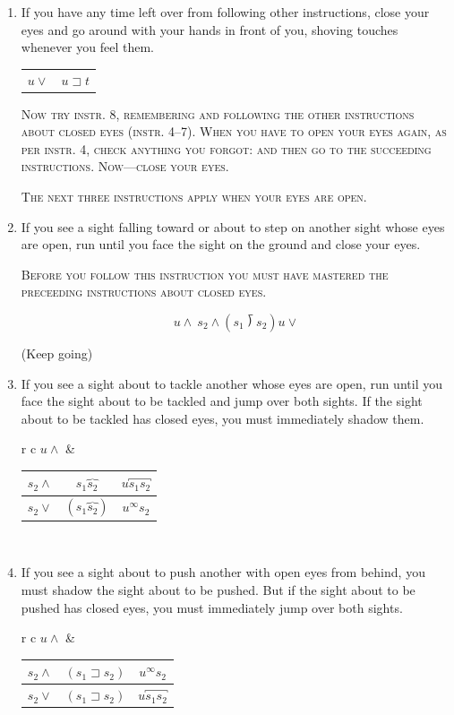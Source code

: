 \begin{enumerate}[label=\arabic*.,nosep, wide]
\item If you have any time left over from following other instructions, 
close your eyes and go around with your hands in front of you, shoving 
touches whenever you feel them. 

\begin{tabular}{ c c }
	$u\vee$ & $u\sqsupset t$ \\
\end{tabular}

\textsc{Now try instr. 8, remembering and following the other instructions about closed eyes (instr. 4--7).
When you have to open your eyes again, as per instr. 4, check anything you forgot: and then go to the
succeeding instructions. Now---close your eyes.}

\textsc{The next three instructions apply when your eyes are open.}

\item If you see a sight falling toward or about to step on another sight 
whose eyes are open, run until you face the sight on the ground and close 
your eyes. 

\textsc{Before you follow this instruction you must have mastered the preceeding instructions about closed eyes.}

$$
u\wedge\ s_2\wedge(s_1\longdivision{s_2}) u\vee
$$

(Keep going) 

\clearpage


\item If you see a sight about to tackle another whose eyes are open, run 
until you face the sight about to be tackled and jump over both sights. If the 
sight about to be tackled has closed eyes, you must immediately shadow 
them. 

\begin{tabular}{ r c }
	$u\wedge$ & \begin{tabular}{ c c c }
		$s_2\wedge$ & $s_1\overbrace{s_2}$ & $u\overbracket{s_1s_2}$ \\ \midrule
		$s_2\vee$ & $(s_1\overbrace{s_2})$ & $u^\infty s_2$
	\end{tabular} \\
\end{tabular}

\item If you see a sight about to push another with open eyes from 
behind, you must shadow the sight about to be pushed. But if the sight 
about to be pushed has closed eyes, you must immediately jump over both 
sights. 

\begin{tabular}{ r c }
	$u\wedge$ & \begin{tabular}{ c c c }
		$s_2\wedge$ & $(s_1\sqsupset s_2)$ & $u^\infty s_2$ \\ \midrule
		$s_2\vee$ & $(s_1\sqsupset s_2)$ & $u\overbracket{s_1s_2}$ \\
	\end{tabular} \\
\end{tabular}
\end{enumerate}


